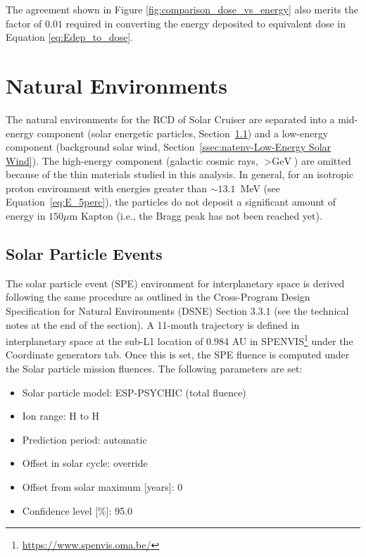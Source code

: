 \documentclass{hitec}
\begin{document}
The agreement shown in Figure \ref{fig:comparison_dose_vs_energy} also merits the factor of $0.01$ required in converting the energy deposited to equivalent dose in Equation \eqref{eq:Edep_to_dose}.

\clearpage %
\section{Natural Environments}
\label{sec:Natural Environment}

The natural environments for the RCD of Solar Cruiser are separated into a mid-energy component (solar energetic particles, Section~\ref{ssec:natenv-Solar Particle Events}) and a low-energy component (background solar wind, Section~\ref{ssec:natenv-Low-Energy Solar Wind}). The high-energy component (galactic cosmic rays, $> \text{GeV}$) are omitted because of the thin materials studied in this analysis. In general, for an isotropic proton environment with energies greater than $\sim 13.1$~MeV (see Equation~\eqref{eq:E_5perc}), the particles do not deposit a significant amount of energy in $150 \mu$m Kapton (i.e., the Bragg peak has not been reached yet).


\subsection{Solar Particle Events}
\label{ssec:natenv-Solar Particle Events}

The solar particle event (SPE) environment for interplanetary space is derived following the same procedure as outlined in the Cross-Program Design Specification for Natural Environments (DSNE) Section 3.3.1 (see the technical notes at the end of the section). A 11-month trajectory is defined in interplanetary space at the sub-L1 location of 0.984 AU in SPENVIS\footnote{\url{https://www.spenvis.oma.be/}} under the \textsf{Coordinate generators} tab. Once this is set, the SPE fluence is computed under the \textsf{Solar particle mission fluences}. The following parameters are set:
\begin{itemize}
	\item Solar particle model: ESP-PSYCHIC (total fluence)
	\item Ion range: H to H
	\item Prediction period: automatic
	\item Offset in solar cycle: override
	\item Offset from solar maximum [years]: 0
	\item Confidence level [\%]: 95.0
\end{itemize}
\end{document}
